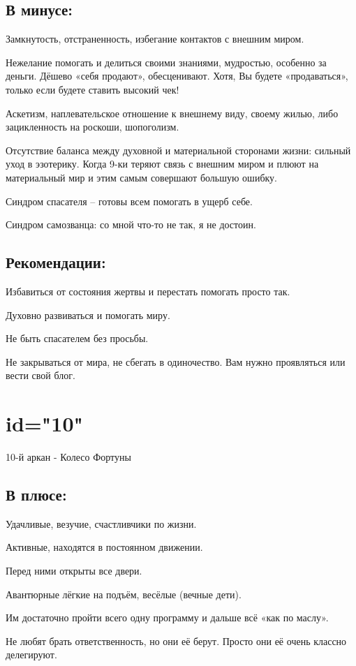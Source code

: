 \subsection{В минусе:}
\item Замкнутость, отстраненность, избегание контактов с внешним миром.
\item Нежелание помогать и делиться своими знаниями, мудростью, особенно за деньги. Дёшево «себя продают», обесценивают. Хотя, Вы будете «продаваться», только если будете ставить высокий чек!
\item Аскетизм, наплевательское отношение к внешнему виду, своему жилью, либо зацикленность на роскоши, шопоголизм.
\item Отсутствие баланса между духовной и материальной сторонами жизни: сильный уход в эзотерику. Когда 9-ки теряют связь с внешним миром и плюют на материальный мир и этим самым совершают большую ошибку.
\item Синдром спасателя – готовы всем помогать в ущерб себе.
\item Синдром самозванца: со мной что-то не так, я не достоин.
\endsubsection

\subsection{Рекомендации:}
\item Избавиться от состояния жертвы и перестать помогать просто так.
\item Духовно развиваться и помогать миру.
\item Не быть спасателем без просьбы.
\item Не закрываться от мира, не сбегать в одиночество. Вам нужно проявляться или вести свой блог.
\endsubsection

\endsection

\section{id="10"}{10-й аркан - Колесо Фортуны}

\subsection{В плюсе:}
\item Удачливые, везучие, счастливчики по жизни.
\item Активные, находятся в постоянном движении.
\item Перед ними открыты все двери.
\item Авантюрные лёгкие на подъём, весёлые (вечные дети).
\item Им достаточно пройти всего одну программу и дальше всё «как по маслу».
\item Не любят брать ответственность, но они её берут. Просто они её очень классно делегируют.
\endsubsection

